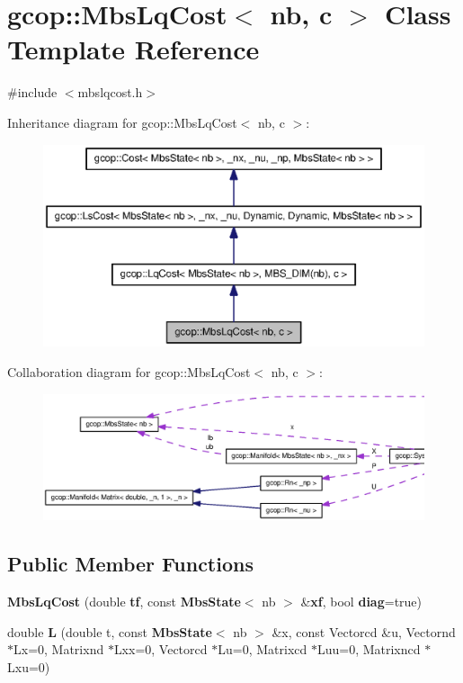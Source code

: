\section{gcop\-:\-:\-Mbs\-Lq\-Cost$<$ nb, c $>$ \-Class \-Template \-Reference}
\label{classgcop_1_1MbsLqCost}


{\ttfamily \#include $<$mbslqcost.\-h$>$}



\-Inheritance diagram for gcop\-:\-:\-Mbs\-Lq\-Cost$<$ nb, c $>$\-:
\nopagebreak
\begin{figure}[H]
\begin{center}
\leavevmode
\includegraphics[width=350pt]{classgcop_1_1MbsLqCost__inherit__graph}
\end{center}
\end{figure}


\-Collaboration diagram for gcop\-:\-:\-Mbs\-Lq\-Cost$<$ nb, c $>$\-:
\nopagebreak
\begin{figure}[H]
\begin{center}
\leavevmode
\includegraphics[width=350pt]{classgcop_1_1MbsLqCost__coll__graph}
\end{center}
\end{figure}
\subsection*{\-Public \-Member \-Functions}
\begin{DoxyCompactItemize}
\item 
{\bf \-Mbs\-Lq\-Cost} (double {\bf tf}, const {\bf \-Mbs\-State}$<$ nb $>$ \&{\bf xf}, bool {\bf diag}=true)
\item 
double {\bf \-L} (double t, const {\bf \-Mbs\-State}$<$ nb $>$ \&x, const \-Vectorcd \&u, \-Vectornd $\ast$\-Lx=0, \-Matrixnd $\ast$\-Lxx=0, \-Vectorcd $\ast$\-Lu=0, \-Matrixcd $\ast$\-Luu=0, \-Matrixncd $\ast$\-Lxu=0)
\end{DoxyCompactItemize}
